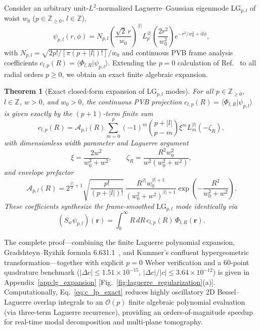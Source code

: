 \documentclass[aps,pra,onecolumn,notitlepage,11pt,tightenlines,amsmath,amssymb,floatfix,longbibliography]{revtex4-2}
\providecommand{\braket}[2]{\langle#1\vert#2\rangle}
\providecommand{\abs}[1]{\lvert#1\rvert}
\newtheorem{theorem}{Theorem}
\begin{document}
Consider an arbitrary unit-$L^2$-normalized Laguerre--Gaussian eigenmode $\mathrm{LG}_{p,l}$ of waist $w_0$ ($p \in \mathbb{Z}_{\ge 0}$, $l \in \mathbb{Z}$),
\begin{equation}
\psi_{p,l}(r,\phi) = N_{p,l}\!\left(\frac{\sqrt{2}\,r}{w_0}\right)^{\abs{l}} L_p^{\abs{l}}\!\left(\frac{2r^2}{w_0^2}\right) e^{-r^2/w_0^2 + il\phi},
\label{eq:lg_def}
\end{equation}
with $N_{p,l} = \sqrt{2p!/[\pi(p+\abs{l})!]}/w_0$ and continuous PVB frame analysis coefficients $c_{l,p}(R) = \braket{\Phi_{l,R}}{\psi_{p,l}}$. Extending the $p = 0$ calculation of Ref.~\cite{Ferreira2026} to all radial orders $p \ge 0$, we obtain an exact finite algebraic expansion.

\begin{theorem}[Exact closed-form expansion of $\mathrm{LG}_{p,l}$ modes]
\label{thm:c_lp_exact}
For all $p \in \mathbb{Z}_{\ge 0}$, $l \in \mathbb{Z}$, $w > 0$, and $w_0 > 0$, the continuous PVB projection $c_{l,p}(R) = \braket{\Phi_{l,R}}{\psi_{p,l}}$ is given exactly by the $(p+1)$-term finite sum
\begin{equation}
c_{l,p}(R) = \mathcal{A}_{p,l}(R) \sum_{m=0}^p (-1)^m \binom{p+\abs{l}}{p-m} \xi^m L_m^{\abs{l}}(-\zeta_R),
\label{eq:c_lp_exact}
\end{equation}
with dimensionless width parameter and Laguerre argument
\begin{equation}
\xi = \frac{2w^2}{w_0^2 + w^2}, \qquad \zeta_R = \frac{R^2 w_0^2}{w^2(w_0^2 + w^2)},
\label{eq:xi_zeta_defs}
\end{equation}
and envelope prefactor
\begin{equation}
\mathcal{A}_{p,l}(R) = 2^{\frac{\abs{l}}{2}+1}\sqrt{\frac{p!}{(p+\abs{l})!}}\,\frac{R^{\abs{l}} w_0^{\abs{l}+1}}{(w_0^2 + w^2)^{\abs{l}+1}} \exp\!\left(-\frac{R^2}{w_0^2 + w^2}\right).
\label{eq:A_prefactor}
\end{equation}
These coefficients synthesize the frame-smoothed $\mathrm{LG}_{p,l}$ mode identically via
\begin{equation}
(S_w\psi_{p,l})(\mathbf{r}) = \int_0^\infty R\,dR\, c_{l,p}(R)\,\Phi_{l,R}(\mathbf{r}).
\label{eq:frame_synthesis_lg}
\end{equation}
\end{theorem}

The complete proof—combining the finite Laguerre polynomial expansion, Gradshteyn--Ryzhik formula 6.631.1~\cite{Gradshteyn2014}, and Kummer's confluent hypergeometric transformation—together with explicit $p = 0$ Weber verification and a 60-point quadrature benchmark ($\abs{\Delta c} \le 1.51\times 10^{-15}$, $\abs{\Delta c}/\abs{c} \le 3.64\times 10^{-12}$) is given in Appendix~\ref{app:lg_expansion} [Fig.~\ref{fig:laguerre_regularization}(a)]. Computationally, Eq.~\eqref{eq:c_lp_exact} reduces highly oscillatory 2D Bessel--Laguerre overlap integrals to an $\mathcal{O}(p)$ finite algebraic polynomial evaluation (via three-term Laguerre recurrence), providing an orders-of-magnitude speedup for real-time modal decomposition and multi-plane tomography.
\end{document}
